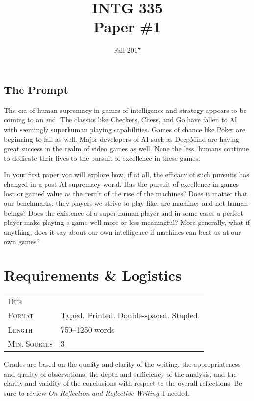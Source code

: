 \documentclass[nobib]{tufte-handout}
\title{INTG 335 \\ Paper \#1 }
\date{ Fall 2017 }
\begin{document}
\maketitle
\thispagestyle{empty}

\subsection*{The Prompt}

The era of human supremacy in games of intelligence and strategy appears to be coming to an end. The classics like Checkers, Chess, and Go have fallen to AI with seemingly superhuman playing capabilities. Games of chance like Poker are beginning to fall as well. Major developers of AI such as DeepMind are having great success in the realm of video games as well. None the less, humans continue to dedicate their lives to the pursuit of excellence in these games.

In your first paper you will explore how, if at all, the efficacy of such pursuits has changed in a post-AI-supremacy world. Has the pursuit of excellence in games lost or gained value as the result of the rise of the machines? Does it matter that our benchmarks, they players we strive to play like,  are machines and not human beings?  Does the existence of a super-human player and in some cases a perfect player make playing a game well more or less meaningful? More generally, what if anything, does it say about our own intelligence if machines can beat us at our own games?

\section{Requirements \& Logistics}

\begin{tabular}{ll}
\textsc{Due} &  \\
\textsc{Format} & Typed. Printed. Double-spaced. Stapled. \\
\textsc{Length} & 750--1250 words \\
\textsc{Min. Sources} & 3
\end{tabular}
\vspace{.25in}

Grades are based on the quality and clarity of the writing, the appropriateness and quality of observations, the depth and sufficiency of the analysis, and the clarity and validity of the conclusions with respect to the overall reflections. Be sure to review \textit{On Reflection and Reflective Writing} if needed.
\end{document}
